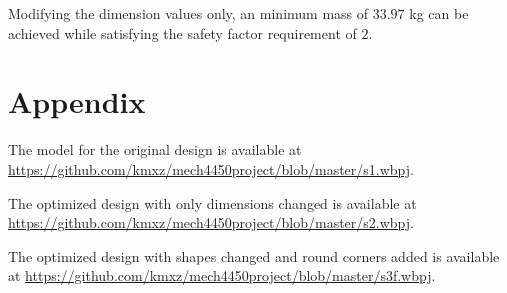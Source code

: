 \documentclass[a4paper,14pt]{extarticle}
\begin{document}
Modifying the dimension values only, an minimum mass of $33.97$ kg can be achieved while satisfying the safety factor requirement of $2$.

\section{Appendix}
The model for the original design is available at \url{https://github.com/kmxz/mech4450project/blob/master/s1.wbpj}.

The optimized design with only dimensions changed is available at \url{https://github.com/kmxz/mech4450project/blob/master/s2.wbpj}.

The optimized design with shapes changed  and round corners added is available at \url{https://github.com/kmxz/mech4450project/blob/master/s3f.wbpj}.
\end{document}
